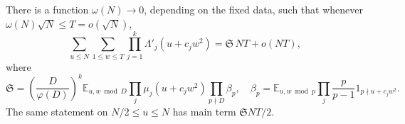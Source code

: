 \begin{proposition}\label{prop:v5-artin-patterns}
There is a function $\omega(N)\to0$, depending on the fixed data, such that
whenever $\omega(N)\sqrt N\leq T=o(\sqrt N)$,
\begin{equation}\label{eq:v5-artin-patterns}
 \sum_{u\leq N}\sum_{1\leq w\leq T}
       \prod_{j=1}^k\Lambda'_j(u+c_jw^2)
       =\mathfrak S\,NT+o(NT),
\end{equation}
where
\begin{equation}\label{eq:v5-artin-series}
 \mathfrak S=
 \left(\frac D{\varphi(D)}\right)^k
 \mathbb E_{u,w\bmod D}\prod_j\mu_j(u+c_jw^2)
 \prod_{p\nmid D}\beta_p,
 \quad
 \beta_p=\mathbb E_{u,w\bmod p}
       \prod_j\frac p{p-1}1_{p\nmid u+c_jw^2}.
\end{equation}
The same statement on $N/2\leq u\leq N$ has main term
$\mathfrak SNT/2$.
\end{proposition}
